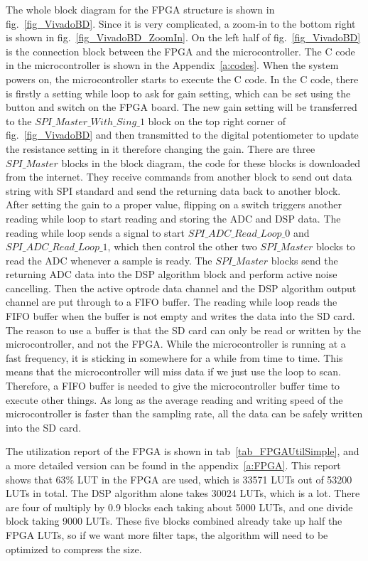 The whole block diagram for the FPGA structure is shown in fig.~\ref{fig_VivadoBD}.  Since it is very complicated, a zoom-in to the bottom right is shown in fig.~\ref{fig_VivadoBD_ZoomIn}.  On the left half of fig.~\ref{fig_VivadoBD} is the connection block between the FPGA and the microcontroller.  The C code in the microcontroller is shown in the Appendix~\ref{a:codes}.  When the system powers on, the microcontroller starts to execute the C code.  In the C code, there is firstly a setting while loop to ask for gain setting, which can be set using the button and switch on the FPGA board.  The new gain setting will be transferred to the $SPI\_Master\_With\_Sing\_1$ block on the top right corner of fig.~\ref{fig_VivadoBD} and then transmitted to the digital potentiometer to update the resistance setting in it therefore changing the gain.  There are three $SPI\_Master$ blocks in the block diagram, the code for these blocks is downloaded from the internet.  They receive commands from another block to send out data string with SPI standard and send the returning data back to another block.  After setting the gain to a proper value, flipping on a switch triggers another reading while loop to start reading and storing the ADC and DSP data.  The reading while loop sends a signal to start $SPI\_ADC\_Read\_Loop\_0$ and $SPI\_ADC\_Read\_Loop\_1$, which then control the other two $SPI\_Master$ blocks to read the ADC whenever a sample is ready.  The $SPI\_Master$ blocks send the returning ADC data into the DSP algorithm block and perform active noise cancelling.  Then the active optrode data channel and the DSP algorithm output channel are put through to a FIFO buffer.  The reading while loop reads the FIFO buffer when the buffer is not empty and writes the data into the SD card.  The reason to use a buffer is that the SD card can only be read or written by the microcontroller, and not the FPGA.  While the microcontroller is running at a fast frequency, it is sticking in somewhere for a while from time to time.  This means that the microcontroller will miss data if we just use the loop to scan.  Therefore, a FIFO buffer is needed to give the microcontroller buffer time to execute other things.  As long as the average reading and writing speed of the microcontroller is faster than the sampling rate, all the data can be safely written into the SD card.

The utilization report of the FPGA is shown in tab~\ref{tab_FPGAUtilSimple}, and a more detailed version can be found in the appendix~\ref{a:FPGA}.  This report shows that 63\% LUT in the FPGA are used, which is 33571 LUTs out of 53200 LUTs in total.  The DSP algorithm alone takes 30024 LUTs, which is a lot.  There are four of multiply by 0.9 blocks each taking about 5000 LUTs, and one divide block taking 9000 LUTs.  These five blocks combined already take up half the FPGA LUTs, so if we want more filter taps, the algorithm will need to be optimized to compress the size.


